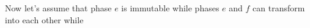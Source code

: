 Now let's assume that phase \(e\) is immutable while phases \(e\) and \(f\) can transform into each other while 